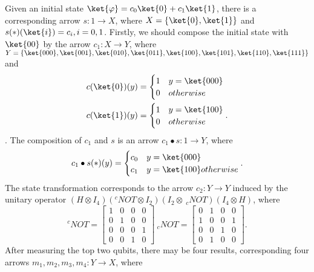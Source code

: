 \documentclass{llncs}
\begin{document}
Given an initial state $\ket{\varphi}=c_0\ket{0}+c_1\ket{1}$, there is a corresponding arrow $s:1\rightarrow X$, where $X=\{\ket{0},\ket{1}\}$ and $s(\ast)(\ket{i})=c_i, i=0,1$. Firstly, we should compose the initial state with $\ket{00}$ by the arrow $c_1:X\rightarrow Y$, where $Y=\{\ket{000},\ket{001},\ket{010},\ket{011},\ket{100},\ket{101},\ket{110},\ket{111}\}$ and 
$$\begin{aligned}
c(\ket{0})(y)&=\begin{cases} 1 &y=\ket{000}\\ 0 &otherwise\end{cases}\\
c(\ket{1})(y)&=\begin{cases} 1 &y=\ket{100}\\ 0 &otherwise\end{cases}.
\end{aligned}
$$. 
The composition of $c_1$ and $s$ is an arrow $c_1\bullet s:1\rightarrow Y$, where 
$$
c_1\bullet s(\ast)(y)=\begin{cases} c_0 & y=\ket{000} \\ c_1 & y=\ket{100} otherwise \end{cases}.
$$
The state transformation corresponds to the arrow $c_2:Y\rightarrow Y$ induced by the unitary operator $(H\otimes I_4)(^cNOT\otimes I_2)(I_2\otimes \ _cNOT)(I_4\otimes H)$, where 
$$
^cNOT=\begin{bmatrix}
1 & 0 & 0 & 0 \\
0 & 1 & 0 & 0 \\
0 & 0 & 0 & 1 \\
0 & 0 & 1 & 0
\end{bmatrix}  
\ _cNOT=\begin{bmatrix}
0 & 1 & 0 & 0 \\
1 & 0 & 0 & 1 \\
0 & 0 & 1 & 0 \\
0 & 1 & 0 & 0
\end{bmatrix}.  
$$
After measuring the top two qubits, there may be four results, corresponding four arrows $m_1,m_2,m_3,m_4:Y\rightarrow X$, where 
\end{document}
